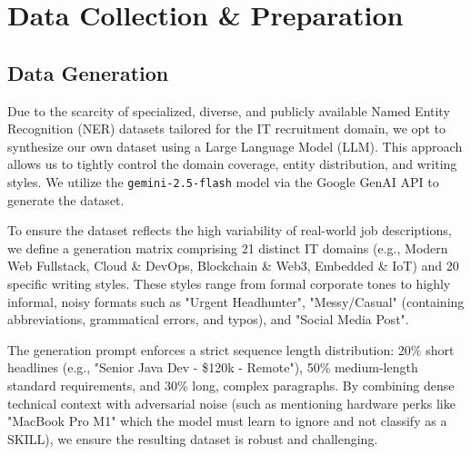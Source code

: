 \section{Data Collection \& Preparation}

\subsection{Data Generation}
Due to the scarcity of specialized, diverse, and publicly available Named Entity Recognition (NER) datasets tailored for the IT recruitment domain, we opt to synthesize our own dataset using a Large Language Model (LLM). This approach allows us to tightly control the domain coverage, entity distribution, and writing styles. We utilize the \texttt{gemini-2.5-flash} model via the Google GenAI API to generate the dataset.

To ensure the dataset reflects the high variability of real-world job descriptions, we define a generation matrix comprising 21 distinct IT domains (e.g., Modern Web Fullstack, Cloud \& DevOps, Blockchain \& Web3, Embedded \& IoT) and 20 specific writing styles. These styles range from formal corporate tones to highly informal, noisy formats such as "Urgent Headhunter", "Messy/Casual" (containing abbreviations, grammatical errors, and typos), and "Social Media Post". 

The generation prompt enforces a strict sequence length distribution: 20\% short headlines (e.g., "Senior Java Dev - \$120k - Remote"), 50\% medium-length standard requirements, and 30\% long, complex paragraphs. By combining dense technical context with adversarial noise (such as mentioning hardware perks like "MacBook Pro M1" which the model must learn to ignore and not classify as a SKILL), we ensure the resulting dataset is robust and challenging.

